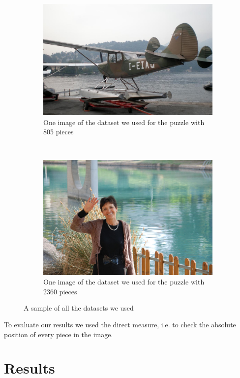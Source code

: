 \documentclass[11pt]{report}
\begin{document}
\begin{figure}
\begin{subfigure}[b]{0.45\textwidth}
		\includegraphics[width=\textwidth]{../imData/805/1.jpg}
		\caption{One image of the dataset we used for the puzzle with 805 pieces}
		\label{img:805}
	\end{subfigure}
	~
	\begin{subfigure}[b]{0.45\textwidth}
		\includegraphics[width=\textwidth]{../imData/2360/1.jpg}
		\caption{One image of the dataset we used for the puzzle with 2360 pieces}
		\label{img:2360}
	\end{subfigure}

	\caption{A sample of all the datasets we used}
	\label{fig:database}
\end{figure}

To evaluate our results we used the direct measure, i.e. to check the absolute position of every piece in the image.


\chapter{Results}
\end{document}
